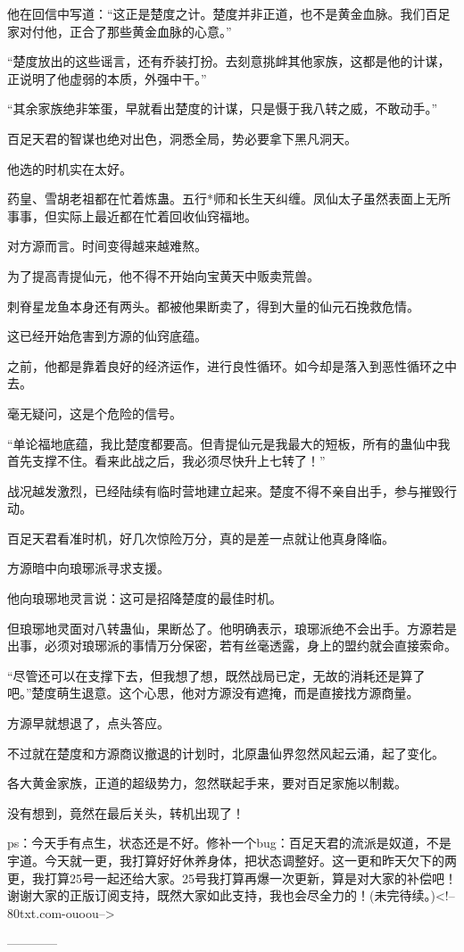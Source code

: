 \begin{this_body}
他在回信中写道：“这正是楚度之计。楚度并非正道，也不是黄金血脉。我们百足家对付他，正合了那些黄金血脉的心意。”

“楚度放出的这些谣言，还有乔装打扮。去刻意挑衅其他家族，这都是他的计谋，正说明了他虚弱的本质，外强中干。”

“其余家族绝非笨蛋，早就看出楚度的计谋，只是慑于我八转之威，不敢动手。”

百足天君的智谋也绝对出色，洞悉全局，势必要拿下黑凡洞天。

他选的时机实在太好。

药皇、雪胡老祖都在忙着炼蛊。五行*师和长生天纠缠。凤仙太子虽然表面上无所事事，但实际上最近都在忙着回收仙窍福地。

对方源而言。时间变得越来越难熬。

为了提高青提仙元，他不得不开始向宝黄天中贩卖荒兽。

刺脊星龙鱼本身还有两头。都被他果断卖了，得到大量的仙元石挽救危情。

这已经开始危害到方源的仙窍底蕴。

之前，他都是靠着良好的经济运作，进行良性循环。如今却是落入到恶性循环之中去。

毫无疑问，这是个危险的信号。

“单论福地底蕴，我比楚度都要高。但青提仙元是我最大的短板，所有的蛊仙中我首先支撑不住。看来此战之后，我必须尽快升上七转了！”

战况越发激烈，已经陆续有临时营地建立起来。楚度不得不亲自出手，参与摧毁行动。

百足天君看准时机，好几次惊险万分，真的是差一点就让他真身降临。

方源暗中向琅琊派寻求支援。

他向琅琊地灵言说：这可是招降楚度的最佳时机。

但琅琊地灵面对八转蛊仙，果断怂了。他明确表示，琅琊派绝不会出手。方源若是出事，必须对琅琊派的事情万分保密，若有丝毫透露，身上的盟约就会直接索命。

“尽管还可以在支撑下去，但我想了想，既然战局已定，无故的消耗还是算了吧。”楚度萌生退意。这个心思，他对方源没有遮掩，而是直接找方源商量。

方源早就想退了，点头答应。

不过就在楚度和方源商议撤退的计划时，北原蛊仙界忽然风起云涌，起了变化。

各大黄金家族，正道的超级势力，忽然联起手来，要对百足家施以制裁。

没有想到，竟然在最后关头，转机出现了！

ps：今天手有点生，状态还是不好。修补一个bug：百足天君的流派是奴道，不是宇道。今天就一更，我打算好好休养身体，把状态调整好。这一更和昨天欠下的两更，我打算25号一起还给大家。25号我打算再爆一次更新，算是对大家的补偿吧！谢谢大家的正版订阅支持，既然大家如此支持，我也会尽全力的！(未完待续。)<!--80txt.com-ouoou-->

------------

\end{this_body}

